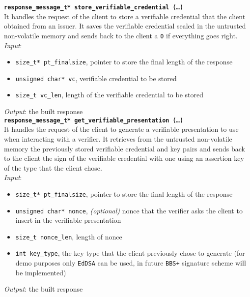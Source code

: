 \noindent
\texttt{\bfseries response\_message\_t* store\_verifiable\_credential (\dots)}\\
It handles the request of the client to store a verifiable credential that the client obtained from an issuer. It saves the verifiable credential sealed in the untrusted non-volatile memory and sends back to the client a \texttt{0} if everything goes right. \\
\textit{Input}:
\begin{itemize}[noitemsep,nolistsep]
  \item \texttt{size\_t* pt\_finalsize}, pointer to store the final length of the response
  \item \texttt{unsigned char* vc}, verifiable credential to be stored
  \item \texttt{size\_t vc\_len}, length of the verifiable credential to be stored
\end{itemize}
\textit{Output}: the built response \\

\noindent
\texttt{\bfseries response\_message\_t* get\_verifiable\_presentation (\dots)}\\
It handles the request of the client to generate a verifiable presentation to use when interacting with a verifier. It retrieves from the untrusted non-volatile memory the previously stored verifiable credential and key pairs and sends back to the client the sign of the verifiable credential with one using an assertion key of the type that the client chose. \\
\textit{Input}:
\begin{itemize}[noitemsep,nolistsep]
  \item \texttt{size\_t* pt\_finalsize}, pointer to store the final length of the response
  \item \texttt{unsigned char* nonce}, \textit{(optional)} nonce that the verifier asks the client to insert in the verifiable presentation  
  \item \texttt{size\_t nonce\_len}, length of nonce
  \item \texttt{int key\_type}, the key type that the client previously chose to generate (for demo purposes only \texttt{EdDSA} can be used, in future \texttt{BBS+} signature scheme will be implemented)
\end{itemize}
\textit{Output}: the built response 



